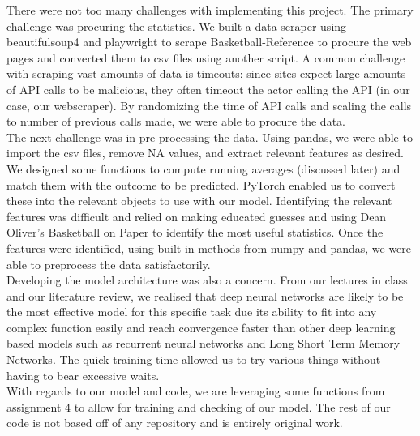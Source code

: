 \documentclass[10pt,twocolumn,letterpaper]{article}
\begin{document}
There were not too many challenges with implementing this project. The 
primary challenge was procuring the statistics. We built a
data scraper using beautifulsoup4 and playwright to scrape Basketball-Reference \cite{BBR} to procure the web pages and converted them to csv files using another script. A common challenge with scraping vast amounts of data is timeouts: since sites expect large amounts of API calls to be malicious, they often timeout the actor calling the API (in our case, our webscraper). By randomizing the time of API calls and scaling the calls to number of previous calls made, we were able to procure the data. \\

The next challenge was in pre-processing the data. Using pandas, we were
able to import the csv files, remove NA values, and extract relevant
features as desired. We designed some functions to compute running averages (discussed later) and match them with the outcome to be predicted. PyTorch enabled us to convert these into the relevant
objects to use with our model. Identifying the relevant features was difficult and relied on making educated guesses and using Dean Oliver's Basketball on Paper \cite{Oliver} to identify the most useful statistics. Once the features were identified, using built-in methods from numpy and pandas, we were able to preprocess the data satisfactorily. \\

Developing the model architecture was also a concern. From our lectures in class and our literature review, we realised that deep neural networks are likely to be the most effective model for this specific task due its ability to fit into any complex function easily and reach convergence faster than other deep learning based models such as recurrent neural networks and Long Short Term Memory Networks. The quick training time allowed us to try various things without having to bear excessive waits. \\

With regards to our model and code, we are leveraging some functions
from assignment 4 to allow for training and checking of our model.
The rest of our code is not based off of any repository and is entirely original work. \\



\end{document}
